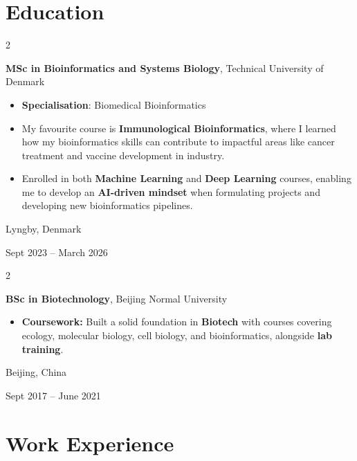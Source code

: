 \documentclass[10pt, letterpaper]{article}
\newenvironment{highlights}{
    \begin{itemize}[
        topsep=0.10 cm,
        parsep=0.10 cm,
        partopsep=0pt,
        itemsep=0pt,
        leftmargin=0.4 cm + 10pt
    ]
}{
    \end{itemize}
}
\newenvironment{twocolentry}[2][]{
    \onecolentry
    \def\secondColumn{#2}
    \setcolumnwidth{\fill, 4.5 cm}
    \begin{paracol}{2}
}{
    \switchcolumn \raggedleft \secondColumn
    \end{paracol}
    \endonecolentry
}
\begin{document}
    \section{Education}

        \begin{twocolentry}{
    Lyngby, Denmark

    Sept 2023 -- March 2026
}
    \textbf{MSc in Bioinformatics and Systems Biology}, Technical University of Denmark
    \begin{highlights}
        \item \textbf{Specialisation}: Biomedical Bioinformatics
        \item My favourite course is \textbf{Immunological Bioinformatics}, where I learned how my bioinformatics skills can contribute to impactful areas like cancer treatment and vaccine development in industry.
        \item Enrolled in both \textbf{Machine Learning} and \textbf{Deep Learning} courses, enabling me to develop an \textbf{AI-driven mindset} when formulating projects and developing new bioinformatics pipelines.
    \end{highlights}
\end{twocolentry}

        \vspace{0.3 cm}

\begin{twocolentry}{
    Beijing, China

    Sept 2017 -- June 2021
}
    \textbf{BSc in Biotechnology}, Beijing Normal University
    \begin{highlights}
        \item \textbf{Coursework:} Built a solid foundation in \textbf{Biotech} with courses covering ecology, molecular biology, cell biology, and bioinformatics, alongside \textbf{lab training}.
    \end{highlights}
\end{twocolentry}


    \section{Work Experience}
\end{document}
